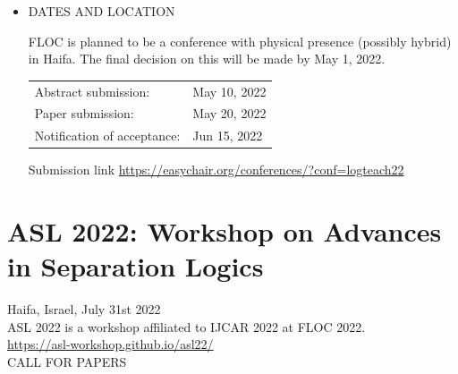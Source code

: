 \documentclass[prodmode,acmtecs]{acmsmall} %
\begin{document}
\begin{itemize}
\item  DATES AND LOCATION  
 
  FLOC is planned to be a conference with physical presence (possibly hybrid) in Haifa. The final decision on this will be made by May 1, 2022. 
 
\begin{tabulary}{\linewidth}{LL}Abstract submission:  & May 10, 2022 \\
Paper submission:  & May 20, 2022 \\
Notification of acceptance:  & Jun 15, 2022 \\
\end{tabulary}
 
  Submission link \href{https://easychair.org/conferences/?conf=logteach22}{https://easychair.org/conferences/?conf=logteach22} 
 
\end{itemize}\section{ASL 2022: Workshop on Advances in Separation Logics }\label{ASL2022}  Haifa, Israel, July 31st 2022\\ 
  ASL 2022 is a workshop affiliated to IJCAR 2022 at FLOC 2022.\\ 
  \href{https://asl-workshop.github.io/asl22/}{https://asl-workshop.github.io/asl22/}\\ 
CALL FOR PAPERS 
\end{document}

